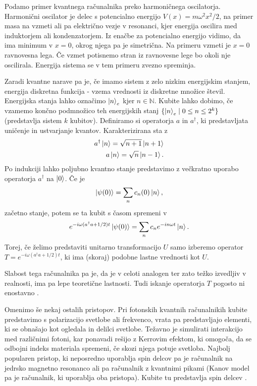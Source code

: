 \documentclass[mat1]{fmfdelo}
\newcommand{\N}{\mathbb N}
\begin{document}
Podamo primer kvantnega računalnika preko harmoničnega oscilatorja. Harmonični oscilator je delec s potencialno energijo \(V(x)=m\omega^2x^2/2\), na primer masa na vzmeti ali pa električno vezje v resonanci, kjer energija oscilira med induktorjem ali kondenzatorjem. Iz enačbe za potencialno energijo vidimo, da ima minimum v \(x=0\), okrog njega pa je simetrična. Na primeru vzmeti je \(x=0\) ravnovesna lega. Če vzmet potisnemo stran iz ravnovesne lege bo okoli nje oscilirala. Energija sistema se v tem primeru zvezno spreminja.

Zaradi kvantne narave pa je, če imamo sistem z zelo nizkim energijskim stanjem, energija diskretna funkcija - vzema vrednosti iz diskretne množice števil. Energijska stanja lahko označimo \(\ket{n}_e\) kjer \(n\in \N\). Kubite lahko dobimo, če vzamemo končno podmnožico teh energijskih stanj \(\{\ket{ n }_e \mid 0\leq n \leq 2^k\}\) (predstavlja sistem \(k\) kubitov). Definiramo si operatorja \(a\) in \(a^\dagger\), ki predstavljata uničenje in ustvarjanje kvantov. Karakterizirana sta z 
\begin{align*}
    a^\dagger \ket n = \sqrt{n+1}\ket{n+1}\\
    a\ket n = \sqrt n \ket{n-1}.
\end{align*}
Po indukciji lahko poljubno kvantno stanje predstavimo z večkratno uporabo operatorja \(a^\dagger\) na \(\ket 0\). Če je
\begin{align*}
    \ket{\psi(0)} = \sum_n c_n(0)\ket n,
\end{align*}
začetno stanje, potem se ta kubit s časom spremeni v
\begin{align*}
     e^{-i\omega(a^\dagger a + 1/2)t}\ket{\psi(0)}
    = \sum_n c_ne^{-in\omega t}\ket n.
\end{align*}
Torej, če želimo predstaviti unitarno transformacijo \(U\) samo izberemo operator \(T = e^{-i\omega(a^\dagger a + 1/2)t}\), ki ima (skoraj) podobne lastne vrednosti kot \(U\).

Slabost tega računalnika pa je, da je v celoti analogen ter zato težko izvedljiv v realnosti, ima pa lepe teoretične lastnosti. Tudi iskanje operatorja \(T\) pogosto ni enostavno \cite[Poglavje 7.3]{nielsen}.

Omenimo še nekaj ostalih pristopov. Pri fotonskih kvantnih računalnikih kubite predstavimo s polarizacijo svetlobe ali frekvenco, vrata pa predstavljajo elementi, ki se obnašajo kot ogledala in delilci svetlobe. Težavno je simulirati interakcijo med različnimi fotoni, kar ponavadi rešijo z Kerrovim efektom, ki omogoča, da se odbojni indeks materiala spremeni, če skozi njega potuje svetloba. Najbolj popularen pristop, ki neposredno uporablja spin delcov pa je računalnik na jedrsko magnetno resonanco ali pa računalnik z kvantnimi pikami (Kanov model pa je računalnik, ki uporablja oba pristopa). Kubite tu predstavlja spin delcev \cite{adamowski}.
\end{document}
